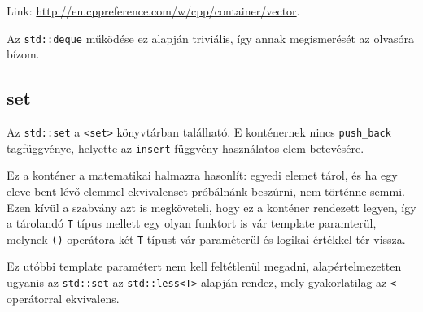 \documentclass[a4paper,11.5pt]{article}
\begin{document}
	\medskip
	Link: \url{http://en.cppreference.com/w/cpp/container/vector}.
	
	\begin{note}
		Az \texttt{std::deque} működése ez alapján triviális, így annak megismerését az olvasóra bízom.
	\end{note}
	\subsection{set}
	
	Az \texttt{std::set} a \texttt{<set>} könyvtárban található. E konténernek nincs \texttt{push\_back} tagfüggvénye, helyette az \texttt{insert} függvény használatos elem betevésére. 
	\medskip
	
	Ez a konténer a matematikai halmazra hasonlít: egyedi elemet tárol, és ha egy eleve bent lévő elemmel ekvivalenset próbálnánk beszúrni, nem történne semmi. Ezen kívül a szabvány azt is megköveteli, hogy ez a konténer rendezett legyen, így a tárolandó \texttt{T} típus mellett egy olyan funktort is vár template paramterül, melynek \texttt{()} operátora két \texttt{T} típust vár paraméterül és logikai értékkel tér vissza.
	\smallskip
	
	Ez utóbbi template paramétert nem kell feltétlenül megadni, alapértelmezetten ugyanis az \texttt{std::set} az \texttt{std::less<T>} alapján rendez, mely gyakorlatilag az \texttt{<} operátorral ekvivalens.
	\smallskip
	
\end{document}
